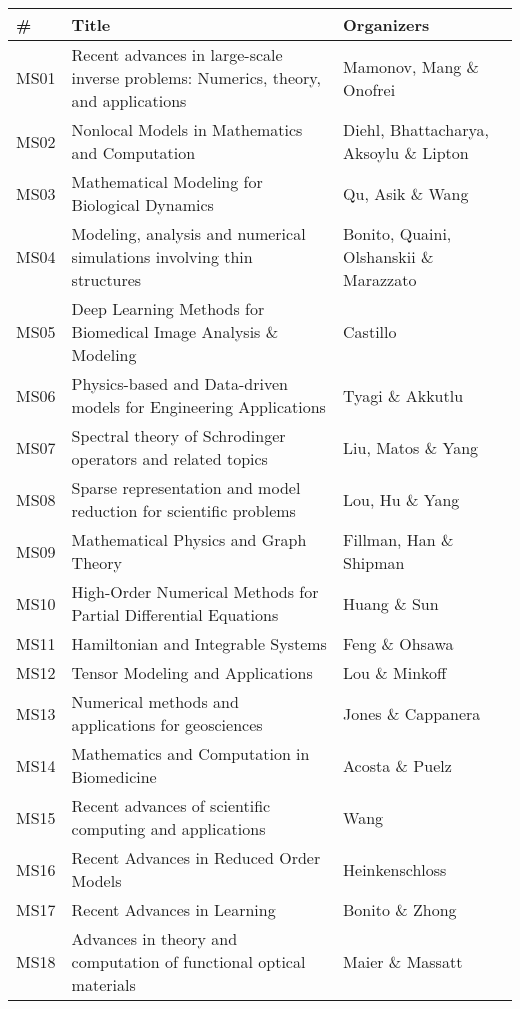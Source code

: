 \begin{center}
\begin{footnotesize}
\begin{tabular}{p{0.8cm} p{9cm} p{6cm}}\toprule
\#   & \bf Title & \bf Organizers \\\midrule
\rowcolor{black!10}
MS01 & Recent advances in large-scale inverse problems: Numerics, theory, and applications & Mamonov, Mang \& Onofrei\\
MS02 & Nonlocal Models in Mathematics and Computation & Diehl, Bhattacharya, Aksoylu \& Lipton\\
\rowcolor{black!10}
MS03 & Mathematical Modeling for Biological Dynamics & Qu, Asik \& Wang\\
MS04 & Modeling, analysis and numerical simulations involving thin structures & Bonito, Quaini, Olshanskii \& Marazzato\\
\rowcolor{black!10}
MS05 & Deep Learning Methods for Biomedical Image Analysis \& Modeling & Castillo\\
MS06 & Physics-based and Data-driven models for Engineering Applications & Tyagi \& Akkutlu\\
\rowcolor{black!10}
MS07 & Spectral theory of Schrodinger operators and related topics & Liu, Matos \& Yang\\
MS08 & Sparse representation and model reduction for scientific problems & Lou, Hu \& Yang\\
\rowcolor{black!10}
MS09 & Mathematical Physics and Graph Theory & Fillman, Han \& Shipman\\
MS10 & High-Order Numerical Methods for Partial Differential Equations & Huang \& Sun\\
\rowcolor{black!10}
MS11 & Hamiltonian and Integrable Systems & Feng \& Ohsawa\\
MS12 & Tensor Modeling and Applications & Lou \& Minkoff\\
\rowcolor{black!10}
MS13 & Numerical methods and applications for geosciences & Jones \& Cappanera\\
MS14 & Mathematics and Computation in Biomedicine & Acosta \& Puelz\\
\rowcolor{black!10}
MS15 & Recent advances of scientific computing and applications & Wang\\
MS16 & Recent Advances in Reduced Order Models & Heinkenschloss\\
\rowcolor{black!10}
MS17 & Recent Advances in Learning & Bonito \& Zhong\\
MS18 & Advances in theory and computation of functional optical materials & Maier \& Massatt\\

\end{tabular}
\end{footnotesize}
\end{center}
